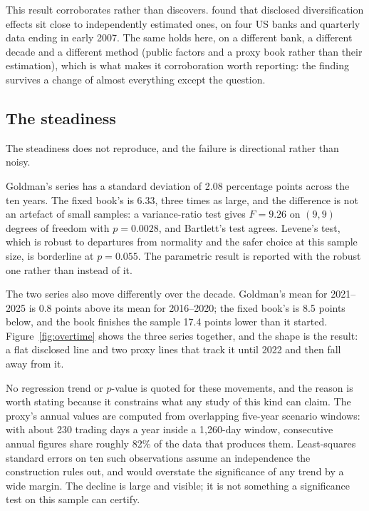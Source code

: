 This result corroborates rather than discovers.
\citet{perignon2010diversification} found that disclosed diversification
effects sit close to independently estimated ones, on four US banks and
quarterly data ending in early 2007. The same holds here, on a different bank,
a different decade and a different method (public factors and a proxy book
rather than their estimation), which is what makes it corroboration worth
reporting: the finding survives a change of almost everything except the
question.

\subsection{The steadiness}

The steadiness does not reproduce, and the failure is directional rather than
noisy.

Goldman's series has a standard deviation of 2.08 percentage points across the
ten years. The fixed book's is 6.33, three times as large, and the difference
is not an artefact of small samples: a variance-ratio test gives $F = 9.26$ on
$(9,9)$ degrees of freedom with $p = 0.0028$, and Bartlett's test agrees.
Levene's test, which is robust to departures from normality and the safer
choice at this sample size, is borderline at $p = 0.055$. The parametric
result is reported with the robust one rather than instead of it.

The two series also move differently over the decade. Goldman's mean for
2021--2025 is 0.8 points above its mean for 2016--2020; the fixed book's is 8.5
points below, and the book finishes the sample 17.4 points lower than it
started. Figure~\ref{fig:overtime} shows the three series together, and the
shape is the result: a flat disclosed line and two proxy lines that track it
until 2022 and then fall away from it.

No regression trend or $p$-value is quoted for these movements, and the reason
is worth stating because it constrains what any study of this kind can claim.
The proxy's annual values are computed from overlapping five-year scenario
windows: with about 230 trading days a year inside a 1{,}260-day window,
consecutive annual figures share roughly 82\% of the data that produces them.
Least-squares standard errors on ten such observations assume an independence
the construction rules out, and would overstate the significance of any trend
by a wide margin. The decline is large and visible; it is not something a
significance test on this sample can certify.

